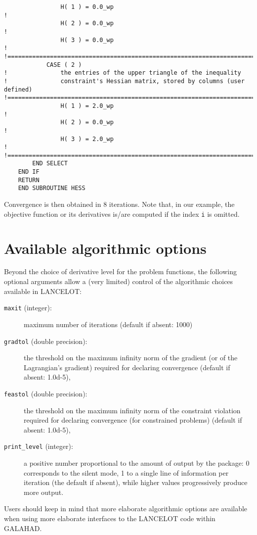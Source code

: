\documentclass{article}
\begin{document}
\begin{lstlisting}
                H( 1 ) = 0.0_wp                                               !
                H( 2 ) = 0.0_wp                                               !
                H( 3 ) = 0.0_wp                                               !
!==============================================================================
            CASE ( 2 )
!               the entries of the upper triangle of the inequality
!               constraint's Hessian matrix, stored by columns (user defined)
!==============================================================================
                H( 1 ) = 2.0_wp                                               !
                H( 2 ) = 0.0_wp                                               !
                H( 3 ) = 2.0_wp                                               !
!==============================================================================
        END SELECT
    END IF
    RETURN
    END SUBROUTINE HESS
\end{lstlisting}
\noindent
Convergence is then obtained in 8 iterations.   Note that, in our
example, the objective function or its derivatives is/are computed if
the index {\tt i} is omitted.

\section{Available algorithmic options}

Beyond the choice of derivative level for the problem functions, the
following optional arguments allow a (very limited) control of the algorithmic
choices available in {\sf LANCELOT}:
\begin{description}
\item[{\tt maxit} (integer):] maximum number of iterations (default if
absent: 1000)
\item[{\tt gradtol} (double precision):] the threshold on the maximum
infinity norm of the gradient (or of the Lagrangian's gradient) required
for declaring convergence (default if absent: 1.0d-5),
\item[{\tt feastol} (double precision):] the threshold on the maximum
infinity norm of the constraint violation required for declaring convergence
(for constrained problems) (default if absent: 1.0d-5),
\item[{\tt print\_level} (integer):] a positive number proportional to the
amount of output by the package: 0 corresponds to the silent mode, 1
to a single line of information per iteration (the default if absent), while
higher values progressively produce more output.
\end{description}
Users should keep in mind that more elaborate algorithmic options are
available
when using more elaborate interfaces to the {\sf LANCELOT} code within
{\sf GALAHAD}.
\end{document}
